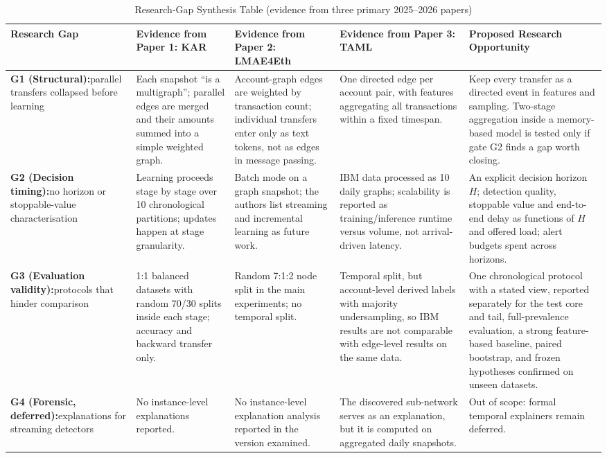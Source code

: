 \documentclass[11pt,a4paper]{article}
\begin{document}
\begin{table}[htbp]
\centering
\scriptsize
\caption{Research-Gap Synthesis Table (evidence from three primary 2025--2026 papers)}
\label{tab:gap_synthesis}
\begin{tabularx}{\textwidth}{L{2.0cm} L{2.75cm} L{2.75cm} L{2.75cm} X}
\toprule
\textbf{Research Gap} & \textbf{Evidence from Paper 1: KAR \cite{tian2025kar}} & \textbf{Evidence from Paper 2: LMAE4Eth \cite{jia2025lmae4eth}} & \textbf{Evidence from Paper 3: TAML \cite{rico2026taml}} & \textbf{Proposed Research Opportunity} \\
\midrule
\textbf{G1 (Structural):}\newline parallel transfers collapsed before learning & Each snapshot ``is a multigraph''; parallel edges are merged and their amounts summed into a simple weighted graph. & Account-graph edges are weighted by transaction count; individual transfers enter only as text tokens, not as edges in message passing. & One directed edge per account pair, with features aggregating all transactions within a fixed timespan. & Keep every transfer as a directed event in features and sampling. Two-stage aggregation inside a memory-based model is tested only if gate G2 finds a gap worth closing. \\
\midrule
\textbf{G2 (Decision timing):}\newline no horizon or stoppable-value characterisation & Learning proceeds stage by stage over 10 chronological partitions; updates happen at stage granularity. & Batch mode on a graph snapshot; the authors list streaming and incremental learning as future work. & IBM data processed as 10 daily graphs; scalability is reported as training/inference runtime versus volume, not arrival-driven latency. & An explicit decision horizon $H$; detection quality, stoppable value and end-to-end delay as functions of $H$ and offered load; alert budgets spent across horizons. \\
\midrule
\textbf{G3 (Evaluation validity):}\newline protocols that hinder comparison & 1:1 balanced datasets with random 70/30 splits inside each stage; accuracy and backward transfer only. & Random 7:1:2 node split in the main experiments; no temporal split. & Temporal split, but account-level derived labels with majority undersampling, so IBM results are not comparable with edge-level results on the same data. & One chronological protocol with a stated view, reported separately for the test core and tail, full-prevalence evaluation, a strong feature-based baseline, paired bootstrap, and frozen hypotheses confirmed on unseen datasets. \\
\midrule
\textbf{G4 (Forensic, deferred):}\newline explanations for streaming detectors & No instance-level explanations reported. & No instance-level explanation analysis reported in the version examined. & The discovered sub-network serves as an explanation, but it is computed on aggregated daily snapshots. & Out of scope: formal temporal explainers remain deferred. \\
\bottomrule
\end{tabularx}
\end{table}
\end{document}
